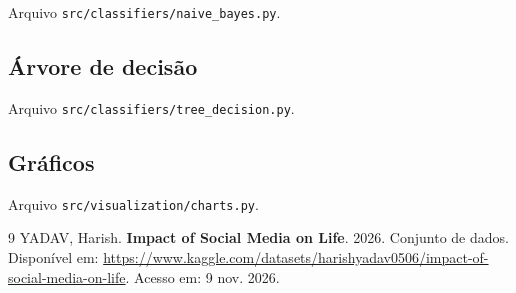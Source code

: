 \documentclass[
  article,
  12pt,
  oneside,
  a4paper,
  english,
  brazil,
  chapter=TITLE,
  section=TITLE,
  subsection=TITLE
]{abntex2}
\begin{document}
Arquivo \texttt{src/classifiers/}\allowbreak\texttt{naive\_bayes.py}.



\subsection{Árvore de decisão}

Arquivo \texttt{src/classifiers/}\allowbreak\texttt{tree\_decision.py}.



\subsection{Gráficos}

Arquivo \texttt{src/visualization/}\allowbreak\texttt{charts.py}.



\postextual

\begin{thebibliography}{9}
YADAV, Harish. \textbf{Impact of Social Media on Life}. 2026. Conjunto de dados. Disponível em: \url{https://www.kaggle.com/datasets/harishyadav0506/impact-of-social-media-on-life}. Acesso em: 9 nov. 2026.
\end{thebibliography}
\end{document}
